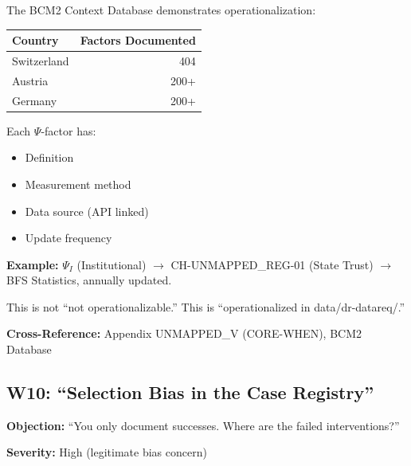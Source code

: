 \begin{axiom}
The BCM2 Context Database demonstrates operationalization:

\begin{center}
\begin{tabular}{lr}
\textbf{Country} & \textbf{Factors Documented} \\
\midrule
Switzerland & 404 \\
Austria & 200+ \\
Germany & 200+ \\
\end{tabular}
\end{center}

Each $\Psi$-factor has:
\begin{itemize}[nosep]
    \item Definition
    \item Measurement method
    \item Data source (API linked)
    \item Update frequency
\end{itemize}

\textbf{Example:} $\Psi_I$ (Institutional) $\rightarrow$ CH-UNMAPPED_REG-01 (State Trust)
$\rightarrow$ BFS Statistics, annually updated.

This is not ``not operationalizable.'' This is ``operationalized in data/dr-datareq/.''
\end{axiom}

\textbf{Cross-Reference:} Appendix UNMAPPED_V (CORE-WHEN), BCM2 Database

\subsection{W10: ``Selection Bias in the Case Registry''}
\label{sec:da-w10}

\begin{tcolorbox}[colback=gray!5!white, colframe=gray!75!black]
\textbf{Objection:} ``You only document successes. Where are the failed interventions?''

\textbf{Severity:} High (legitimate bias concern)
\end{tcolorbox}

